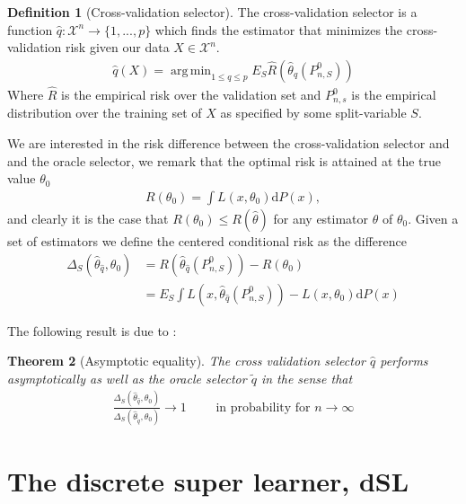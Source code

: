 \documentclass[11pt, a4paper]{article}
\DeclareMathOperator*{\argmin}{arg\,min}
\newtheorem{theorem}{Theorem}
\theoremstyle{definition}
\newtheorem{definition}[theorem]{Definition}
\theoremstyle{remark}
\newcommand{\cl}{q}
\begin{document}
\begin{definition}[Cross-validation selector]
    The cross-validation selector is a function $ \hat{\cl}: \mathcal{X}^{n} \to \{1,...,p\} $  which finds the estimator that minimizes the cross-validation risk given our data $ X \in \mathcal{X}^{n} $. 
    \begin{align*}
        \hat{\cl}(X) = \argmin_{1 \leq \cl \leq p} E_S \hat{R} ( \hat{\theta} _\cl (P_{n,S}^0 )) 
    \end{align*}
    Where $ \hat{R}  $ is the empirical risk over the validation set and $ P_{n ,s}^{0} $ is the empirical distribution over the training set of $ X $ as specified by some split-variable $ S $. 
\end{definition}
We are interested in the risk difference between the cross-validation selector and and the oracle selector, we remark that the optimal risk is attained at the true value $ \theta_0 $ 
\begin{align*}
    R(\theta_0) = \int L(x, \theta_0)  \mathrm{d}P(x),
\end{align*}
and clearly it is the case that $ R(\theta_0) \leq R( \hat{\theta}  ) $ for any estimator $ \hat{\theta} $ of $ \theta_0 $.
Given a set of estimators we define the centered conditional risk as the difference 
\begin{align*}
    \Delta_{S}( \hat{\theta}_{ \hat{\cl} }, \theta_0 ) &= R( \hat{\theta} _{ \hat{\cl} }(P_{n, S}^{0})) -R(\theta_0) \\
                                                       &= E_{S} \int L(x, \hat{\theta}_{ \hat{\cl} }(P_{n, S}^{0})) - L(x, \theta_0) \mathrm{d}P(x) 
\end{align*}

The following result is due to \cite{laan03}: 
\begin{theorem}[Asymptotic equality]
    The cross validation selector $ \hat{\cl} $ performs asymptotically as well as the oracle selector $ \tilde{\cl} $ in the sense that 
    \begin{align*}
        \frac{\Delta_{S}( \hat{\theta}_{ \hat{\cl} } , \theta_0 )}{ \Delta_{S}( \hat{\theta}_{ \tilde{\cl} } , \theta_0) } \to 1 \qquad \text{ in probability for } n \to \infty
    \end{align*}
\end{theorem}


\section{The discrete super learner, dSL}
\end{document}
